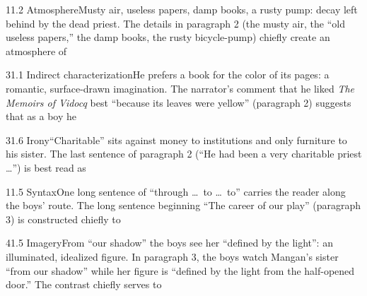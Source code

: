 \documentclass[11pt]{article}
\begin{document}
\begin{q}{1}{1.2 Atmosphere}{Musty air, useless papers, damp books, a rusty pump: decay left behind by the dead priest.}
The details in paragraph 2 (the musty air, the ``old useless papers,'' the damp books, the rusty bicycle-pump) chiefly create an atmosphere of
\end{q}

\begin{q}{3}{1.1 Indirect characterization}{He prefers a book for the color of its pages: a romantic, surface-drawn imagination.}
The narrator's comment that he liked \emph{The Memoirs of Vidocq} best ``because its leaves were yellow'' (paragraph 2) suggests that as a boy he
\end{q}

\begin{q}{3}{1.6 Irony}{``Charitable'' sits against money to institutions and only furniture to his sister.}
The last sentence of paragraph 2 (``He had been a very charitable priest \ldots'') is best read as
\end{q}

\begin{q}{1}{1.5 Syntax}{One long sentence of ``through \ldots\ to \ldots\ to'' carries the reader along the boys' route.}
The long sentence beginning ``The career of our play'' (paragraph 3) is constructed chiefly to
\end{q}

\begin{q}{4}{1.5 Imagery}{From ``our shadow'' the boys see her ``defined by the light'': an illuminated, idealized figure.}
In paragraph 3, the boys watch Mangan's sister ``from our shadow'' while her figure is ``defined by the light from the half-opened door.'' The contrast chiefly serves to
\end{q}
\end{document}
